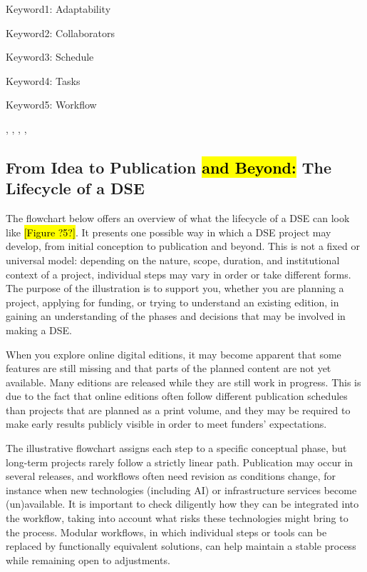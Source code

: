 \documentclass[
  letterpaper,
  DIV=11,
  numbers=noendperiod]{scrreprt}
\begin{document}
Keyword1: Adaptability

Keyword2: Collaborators

Keyword3: Schedule

Keyword4: Tasks

Keyword5: Workflow

, , , ,

\subsection{\texorpdfstring{From Idea to Publication \hl{and Beyond:}
The Lifecycle of a
DSE}{From Idea to Publication and Beyond: The Lifecycle of a DSE}}\label{from-idea-to-publication-and-beyond-the-lifecycle-of-a-dse}

The flowchart below offers an overview of what the lifecycle of a DSE
can look like \hl{{[}Figure ?5?{]}}. It presents one possible way in
which a DSE project may develop, from initial conception to publication
and beyond. This is not a fixed or universal model: depending on the
nature, scope, duration, and institutional context of a project,
individual steps may vary in order or take different forms. The purpose
of the illustration is to support you, whether you are planning a
project, applying for funding, or trying to understand an existing
edition, in gaining an understanding of the phases and decisions that
may be involved in making a DSE.

When you explore online digital editions, it may become apparent that
some features are still missing and that parts of the planned content
are not yet available. Many editions are released while they are still
work in progress. This is due to the fact that online editions often
follow different publication schedules than projects that are planned as
a print volume, and they may be required to make early results publicly
visible in order to meet funders' expectations.

The illustrative flowchart assigns each step to a specific conceptual
phase, but long-term projects rarely follow a strictly linear path.
Publication may occur in several releases, and workflows often need
revision as conditions change, for instance when new technologies
(including AI) or infrastructure services become (un)available. It is
important to check diligently how they can be integrated into the
workflow, taking into account what risks these technologies might bring
to the process. Modular workflows, in which individual steps or tools
can be replaced by functionally equivalent solutions, can help maintain
a stable process while remaining open to adjustments.
\end{document}
